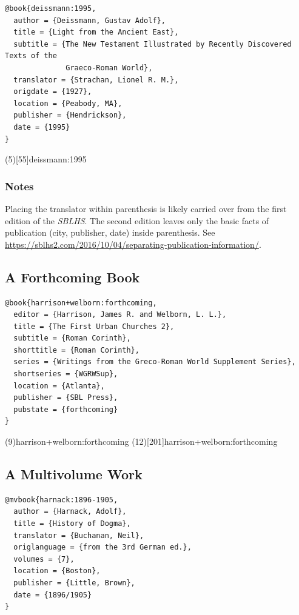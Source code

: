\documentclass[a4paper]{article}
\begin{document}
\begin{verbatim}
@book{deissmann:1995,
  author = {Deissmann, Gustav Adolf},
  title = {Light from the Ancient East},
  subtitle = {The New Testament Illustrated by Recently Discovered Texts of the
              Graeco-Roman World},
  translator = {Strachan, Lionel R. M.},
  origdate = {1927},
  location = {Peabody, MA},
  publisher = {Hendrickson},
  date = {1995}
}
\end{verbatim}

\examplecite(5)[55]{deissmann:1995}
\examplebibliography

\subsubsection{Notes}

Placing the translator within parenthesis is likely carried over from the
first edition of the \emph{SBLHS}. The second edition leaves only the basic
facts of publication (city, publisher, date) inside parenthesis. See
\url{https://sblhs2.com/2016/10/04/separating-publication-information/}.

\subsection{A Forthcoming Book}

\begin{verbatim}
@book{harrison+welborn:forthcoming,
  editor = {Harrison, James R. and Welborn, L. L.},
  title = {The First Urban Churches 2},
  subtitle = {Roman Corinth},
  shorttitle = {Roman Corinth},
  series = {Writings from the Greco-Roman World Supplement Series},
  shortseries = {WGRWSup},
  location = {Atlanta},
  publisher = {SBL Press},
  pubstate = {forthcoming}
}
\end{verbatim}

\examplecite(9){harrison+welborn:forthcoming}
\examplecite(12)[201]{harrison+welborn:forthcoming}
\exampleabbreviations
\examplebibliography

\subsection{A Multivolume Work}

\begin{verbatim}
@mvbook{harnack:1896-1905,
  author = {Harnack, Adolf},
  title = {History of Dogma},
  translator = {Buchanan, Neil},
  origlanguage = {from the 3rd German ed.},
  volumes = {7},
  location = {Boston},
  publisher = {Little, Brown},
  date = {1896/1905}
}
\end{verbatim}
\end{document}
